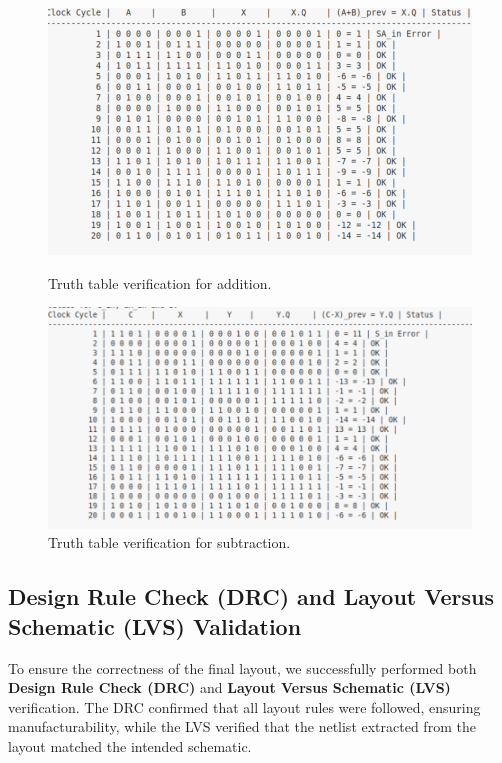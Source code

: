 \documentclass[a4paper,12pt]{article}
\begin{document}
\begin{figure}[H]
    \centering
    \begin{minipage}{0.49\textwidth}
        \centering
        \includegraphics[width=\textwidth]{images/ADD_truth_table.png}
        \caption{Truth table verification for addition.}
    \end{minipage}
    \hfill
    \begin{minipage}{0.49\textwidth}
        \centering
        \includegraphics[width=\textwidth]{images/SUB_truth_table.png}
        \caption{Truth table verification for subtraction.}
    \end{minipage}
\end{figure}
\subsection{Design Rule Check (DRC) and Layout Versus Schematic (LVS) Validation}

To ensure the correctness of the final layout, we successfully performed both \textbf{Design Rule Check (DRC)} and \textbf{Layout Versus Schematic (LVS)} verification. The DRC confirmed that all layout rules were followed, ensuring manufacturability, while the LVS verified that the netlist extracted from the layout matched the intended schematic. 
\end{document}
